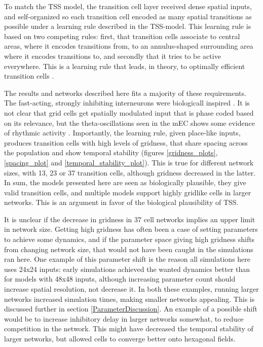 \documentclass{article}
\begin{document}
    To match the TSS model, the transition cell layer received dense spatial inputs, and self-organized so each transition cell encoded as many spatial transitions as possible under a learning rule described in the TSS-model. This learning rule is based on two competing rules: first, that transition cells associate to central areas, where it encodes transitions from, to an annulus-shaped surrounding area where it encodes transitions to, and secondly that it tries to be active everywhere. This is a learning rule that leads, in theory, to optimally efficient transition cells \parencite{Waniek2017}.

    The results and networks described here fits a majority of these requirements. The fast-acting, strongly inhibiting interneurons were biologicall inspired \parencite{Couey2013,Buetfering2014}. It is not clear that grid cells get spatially modulated input that is phase coded based on its relevance, but the theta-oscillations seen in the mEC shows some evidence of rhythmic activity \parencite{Winson1978}. Importantly, the learning rule, given place-like inputs, produces transition cells with high levels of gridness, that share spacing across the population and show temporal stability (figures \ref{gridness_plots}, \ref{spacing_plot} and \ref{temporal_stability_plot}). This is true for different network sizes, with 13, 23 or 37 transition cells, although gridness decreased in the latter. In sum, the models presented here are seen as biologically plausible, they give valid transition cells, and multiple models support highly gridlike cells in larger networks. This is an argument in favor of the biological plausibility of TSS.
    
    It is unclear if the decrease in gridness in 37 cell networks implies an upper limit in network size. Getting high gridness has often been a case of setting parameters to achieve some dynamics, and if the parameter space giving high gridness shifts from changing network size, that would not have been caught in the simulations ran here. One example of this parameter shift is the reason all simulations here uses 24x24 inputs: early simulations achieved the wanted dynamics better than for models with 48x48 inputs, although increasing parameter count should increase spatial resolution, not decrease it. In both these examples, running larger networks increased simulation times, making smaller networks appealing. This is discussed further in section \ref{ParameterDiscussion}. An example of a possible shift would be to increase inhibitory delay in larger networks somewhat, to reduce competition in the network. This might have decreased the temporal stability of larger networks, but allowed cells to converge better onto hexagonal fields.
    
\end{document}
